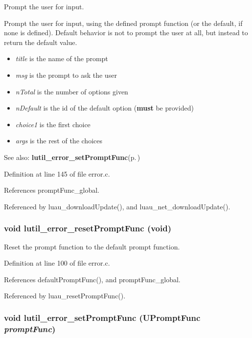 Prompt the user for input. 

Prompt the user for input, using the defined prompt function (or the default, if none is defined). Default behavior is not to prompt the user at all, but instead to return the default value.

\begin{itemize}
\item {\em title\/} is the name of the prompt \item {\em msg\/} is the prompt to ask the user \item {\em n\-Total\/} is the number of options given \item {\em n\-Default\/} is the id of the default option ({\bf must} be provided) \item {\em choice1\/} is the first choice \item {\em args\/} is the rest of the choices\end{itemize}
\begin{Desc}
\item[See also:]{\bf lutil\_\-error\_\-set\-Prompt\-Func}{\rm (p.\,\pageref{error_8h_a5})} \end{Desc}


Definition at line 145 of file error.c.

References prompt\-Func\_\-global.

Referenced by luau\_\-download\-Update(), and luau\_\-net\_\-download\-Update().
\subsubsection{\setlength{\rightskip}{0pt plus 5cm}void lutil\_\-error\_\-reset\-Prompt\-Func (void)}\label{error_8h_a6}


Reset the prompt function to the default prompt function. 



Definition at line 100 of file error.c.

References default\-Prompt\-Func(), and prompt\-Func\_\-global.

Referenced by luau\_\-reset\-Prompt\-Func().
\subsubsection{\setlength{\rightskip}{0pt plus 5cm}void lutil\_\-error\_\-set\-Prompt\-Func ({\bf UPrompt\-Func} {\em prompt\-Func})}\label{error_8h_a5}


